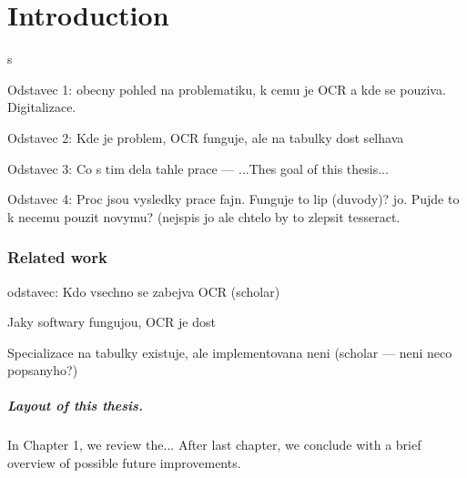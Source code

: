 \chapter*{Introduction}
s

Odstavec 1: obecny pohled na problematiku, k cemu je OCR a kde se pouziva. Digitalizace.

Odstavec 2: Kde je problem, OCR funguje, ale na tabulky dost selhava

Odstavec 3: Co s tim dela tahle prace --- ...Thes goal of this thesis...

Odstavec 4: Proc jsou vysledky prace fajn. Funguje to lip (duvody)? jo. Pujde to k necemu pouzit novymu? (nejspis jo ale chtelo by to zlepsit tesseract.

\subsection*{Related work}

odstavec: Kdo vsechno se zabejva OCR (scholar)

Jaky softwary fungujou, OCR je dost

Specializace na tabulky existuje, ale implementovana neni (scholar --- neni neco popsanyho?)

\paragraph{Layout of this thesis.} In Chapter 1, we review the... After last chapter, we conclude with a brief overview of possible future improvements.

